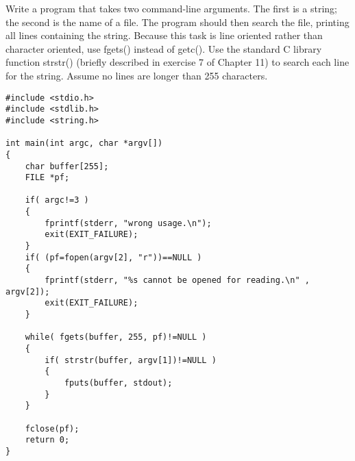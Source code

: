 \begin{question}
Write a program that takes two command-line arguments. The first is a string; the
second is the name of a file. The program should then search the file, printing all lines
containing the string. Because this task is line oriented rather than character oriented,
use fgets() instead of getc(). Use the standard C library function strstr() (briefly
described in exercise 7 of Chapter 11) to search each line for the string. Assume no lines
are longer than 255 characters.
\end{question}
\begin{solution}
  \begin{verbatim}
#include <stdio.h>
#include <stdlib.h>
#include <string.h>

int main(int argc, char *argv[])
{
	char buffer[255];
	FILE *pf;

	if( argc!=3 )
	{
		fprintf(stderr, "wrong usage.\n");
		exit(EXIT_FAILURE);
	}
	if( (pf=fopen(argv[2], "r"))==NULL )
	{
		fprintf(stderr, "%s cannot be opened for reading.\n" , argv[2]);
		exit(EXIT_FAILURE);
	}

	while( fgets(buffer, 255, pf)!=NULL )
	{
		if( strstr(buffer, argv[1])!=NULL )
		{
			fputs(buffer, stdout);
		}
	}

	fclose(pf);
	return 0;
}
  \end{verbatim}
\end{solution}

